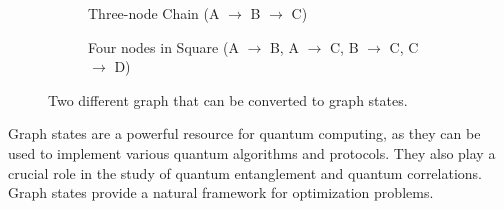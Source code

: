 \documentclass[11pt, letterpaper]{article}
\begin{document}
\begin{figure}[htbp]
    \centering
    
    \begin{subfigure}[b]{0.45\textwidth}
        \centering
        \caption{Three-node Chain (A $\to$ B $\to$ C)}
        \label{fig: graph_a}
    \end{subfigure}
    \hfill %
    \begin{subfigure}[b]{0.45\textwidth}
        \centering
        \caption{Four nodes in Square (A $\to$ B, A $\to$ C, B $\to$ C, C $\to$ D)}
        \label{fig: graph_b}
    \end{subfigure}
    
    \caption{Two different graph that can be converted to graph states.}
    \label{fig: two_graphs}
\end{figure}
Graph states are a powerful resource for quantum computing, as they can be used to implement various quantum algorithms and protocols. They also play a crucial role in the study of quantum entanglement and quantum correlations. Graph states provide a natural framework for optimization problems.
\end{document}
